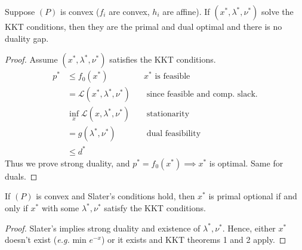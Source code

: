 \documentclass[class=article,crop=false]{standalone}
\begin{document}
\begin{thm}
	Suppose $ (P)$ is convex ($ f_i$ are convex, $ h_i$ are affine). If $ (x^* ,\lambda^* ,\nu^* )$ solve the KKT conditions, then they are the primal and dual optimal and there is no duality gap.
\end{thm}
\begin{proof}
	Assume $ (x^* ,\lambda^* ,\nu^* )$ satisfies the KKT conditions.
	\begin{align*}
		p^* &\leq f_0(x^* ) &&  x^* \text{ is feasible }\\
		    &= \mathscr{L}(x^* ,\lambda^* ,\nu^* ) && \text{ since feasible and comp. slack.} \\
		    &\inf_x \mathscr{L}(x,\lambda^* ,\nu^* ) && \text{ stationarity}  \\
		    &= g(\lambda^* ,\nu^* ) &&  \text{ dual feasibility} \\
		    &\leq d^*  
	\end{align*}
	Thus we prove strong duality, and $ p^* =f_0(x^* ) \implies x^* $ is optimal. Same for duals. 
\end{proof}
\begin{thm}
	If $ (P)$ is convex and Slater's conditions hold, then  $ x^* $ is primal optional if and only if $ x^* $ with some $ \lambda^*, \nu^* $ satisfy the KKT conditions.
\end{thm}
\begin{proof}
	Slater's implies strong duality and existence of $ \lambda^*, \nu^*$. Hence, either $ x^* $ doesn't exist (\emph{e.g.} min $ e^{-x}$) or it exists and KKT theorems 1 and 2 apply.
\end{proof}
\end{document}

